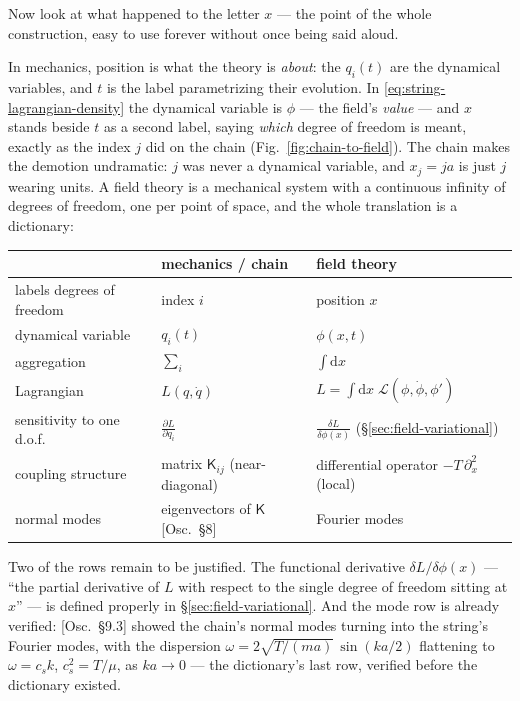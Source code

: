 \documentclass[11pt]{article}
\theoremstyle{plain}
\theoremstyle{definition}
\theoremstyle{remark}
\newcommand{\dd}{\mathrm{d}}
\newcommand{\pd}[2]{\frac{\partial #1}{\partial #2}}
\begin{document}
Now look at what happened to the letter $x$ --- the point of the whole
construction, easy to use forever without once being said aloud.

In mechanics, position is what the theory is \emph{about}: the
$q_i(t)$ are the dynamical variables, and $t$ is the label
parametrizing their evolution. In \eqref{eq:string-lagrangian-density}
the dynamical variable is $\phi$ --- the field's \emph{value} --- and
$x$ stands beside $t$ as a second label, saying \emph{which} degree of
freedom is meant, exactly as the index $j$ did on the chain
(Fig.~\ref{fig:chain-to-field}). The chain makes the demotion
undramatic: $j$ was never a dynamical variable, and $x_j = ja$ is just
$j$ wearing units. A field theory is a mechanical system with a
continuous infinity of degrees of freedom, one per point of space, and
the whole translation is a dictionary:

\begin{center}
\begin{tabular}{lll}
\toprule
 & mechanics / chain & field theory \\
\midrule
labels degrees of freedom & index $i$ & position $x$ \\
dynamical variable & $q_i(t)$ & $\phi(x, t)$ \\
aggregation & $\displaystyle\sum_i$ & $\displaystyle\int \dd x$ \\
Lagrangian & $L(q, \dot q)$ & $L = \displaystyle\int \dd x\;\mathcal L(\phi, \dot\phi, \phi')$ \\
sensitivity to one d.o.f. & $\displaystyle\pd{L}{q_i}$ & $\displaystyle\frac{\delta L}{\delta\phi(x)}$ \quad(\S\ref{sec:field-variational}) \\
coupling structure & matrix $\mathsf K_{ij}$ (near-diagonal) & differential operator $-T\,\partial_x^2$ (local) \\
normal modes & eigenvectors of $\mathsf K$ [Osc.\ \S8] & Fourier modes \\
\bottomrule
\end{tabular}
\end{center}

\noindent
Two of the rows remain to be justified. The functional derivative
$\delta L/\delta\phi(x)$ --- ``the partial derivative of $L$ with
respect to the single degree of freedom sitting at $x$'' --- is
defined properly in \S\ref{sec:field-variational}. And the mode row is
already verified: [Osc.\ \S9.3] showed the chain's normal modes turning
into the string's Fourier modes, with the dispersion
$\omega = 2\sqrt{T/(ma)}\,\sin(ka/2)$ flattening to
$\omega = c_s k$, $c_s^2 = T/\mu$, as $ka \to 0$ --- the dictionary's
last row, verified before the dictionary existed.
\end{document}
